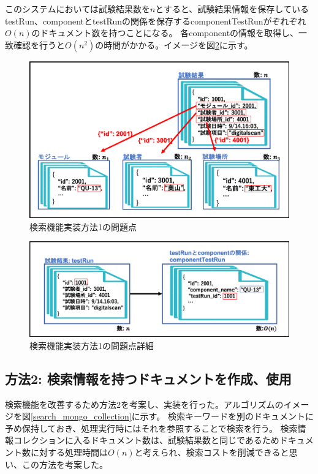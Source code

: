 このシステムにおいては試験結果数を$n$とすると、試験結果情報を保存しているtestRun、componentとtestRunの関係を保存するcomponentTestRunがぞれぞれ$O(n)$のドキュメント数を持つことになる。
各componentの情報を取得し、一致確認を行うと$O(n^2)$の時間がかかる。イメージを図\ref{search_python_testRun}に示す。


\begin{figure}[bpt]
  \begin{center}
    \includegraphics[width=14cm]{search_python_list_problem}
  \caption[検索機能実装方法1の問題点]{検索機能実装方法1の問題点}
  \label{search_python_list_problem}
  \end{center}
\end{figure}

\begin{figure}[bpt]
  \begin{center}
    \includegraphics[width=14cm]{search_python_testRun}
  \caption[検索機能実装方法1の問題点詳細]{検索機能実装方法1の問題点詳細}
  \label{search_python_testRun}
  \end{center}
\end{figure}

\subsection{方法2: 検索情報を持つドキュメントを作成、使用}
検索機能を改善するため方法2を考案し、実装を行った。アルゴリズムのイメージを図\ref{search_mongo_collection}に示す。
検索キーワードを別のドキュメントに予め保持しておき、処理実行時にはそれを参照することで検索を行う。
検索情報コレクションに入るドキュメント数は、試験結果数と同じであるためドキュメント数に対する処理時間は$O(n)$と考えられ、検索コストを削減できると思い、この方法を考案した。

